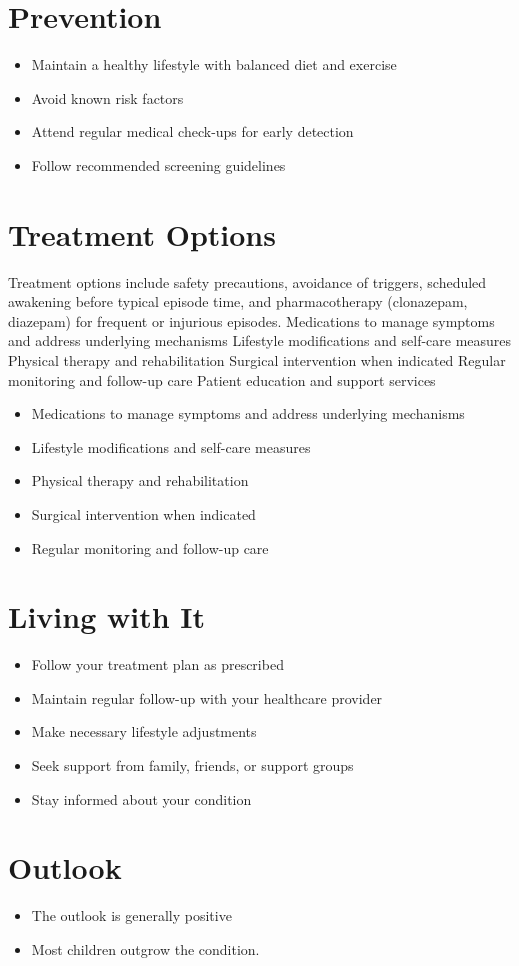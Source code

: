\section{Prevention}
\begin{itemize}[noitemsep]
  \item Maintain a healthy lifestyle with balanced diet and exercise
  \item Avoid known risk factors
  \item Attend regular medical check-ups for early detection
  \item Follow recommended screening guidelines
\end{itemize}
\section{Treatment Options}
Treatment options include safety precautions, avoidance of triggers, scheduled awakening before typical episode time, and pharmacotherapy (clonazepam, diazepam) for frequent or injurious episodes. Medications to manage symptoms and address underlying mechanisms Lifestyle modifications and self-care measures Physical therapy and rehabilitation Surgical intervention when indicated Regular monitoring and follow-up care Patient education and support services

\begin{itemize}[noitemsep]
  \item Medications to manage symptoms and address underlying mechanisms
  \item Lifestyle modifications and self-care measures
  \item Physical therapy and rehabilitation
  \item Surgical intervention when indicated
  \item Regular monitoring and follow-up care
\end{itemize}
\section{Living with It}
\begin{itemize}[noitemsep]
  \item Follow your treatment plan as prescribed
  \item Maintain regular follow-up with your healthcare provider
  \item Make necessary lifestyle adjustments
  \item Seek support from family, friends, or support groups
  \item Stay informed about your condition
\end{itemize}
\section{Outlook}
\begin{itemize}[noitemsep]
  \item The outlook is generally positive
  \item Most children outgrow the condition.
\end{itemize}
